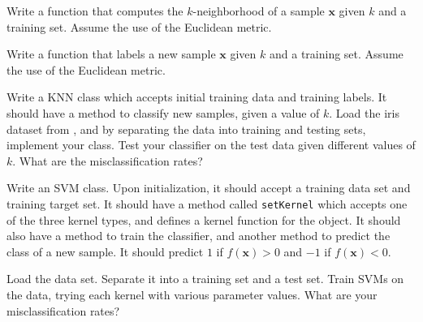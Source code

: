 
Write a function that computes the $k$-neighborhood of a sample 
$\mathbf{x}$ given $k$ and a training set. Assume the use of the Euclidean metric.

Write a function that labels a new sample $\mathbf{x}$ given $k$ and a training set. Assume the use of the Euclidean metric.

Write a KNN class which accepts initial training data and training labels. 
It should have a method to classify new samples, given a value of $k$. 
Load the iris dataset from , and by separating the data into training and testing sets, 
implement your class. Test your classifier on the test data given different values of $k$. 
What are the misclassification rates?

Write an SVM class. Upon initialization, it should accept a training data set and training target set.
It should have a method called \texttt{setKernel} which accepts one of the three kernel types, 
and defines a kernel function for the object. It should also have a method to train the classifier, 
and another method to predict the class of a new sample. 
It should predict $1$ if $f(\mathbf{x}) > 0$ and $-1$ if $f(\mathbf{x}) < 0$.

Load the data set. Separate it into a training set and a test set. 
Train SVMs on the data, trying each kernel with various parameter values. What are your misclassification rates?
